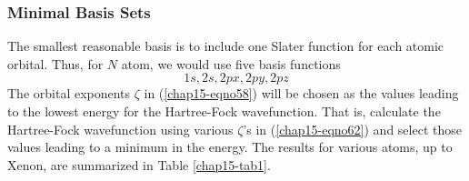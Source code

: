 \subsubsection{Minimal Basis Sets}

The smallest reasonable basis is to include one Slater function for each
atomic orbital. Thus, for $N$ atom, we would use five basis functions
\begin{equation}
1s,2s,2px,2py,2pz 
\label{chap15-eqno62}
\end{equation}
The orbital exponents $\zeta$ in (\ref{chap15-eqno58}) will be chosen
as the values leading to the lowest energy for the Hartree-Fock
wavefunction. That is, calculate the Hartree-Fock wavefunction using
various $\zeta$'s in (\ref{chap15-eqno62}) and select those values
leading to a minimum in the energy. The results for various atoms, up
to Xenon, are summarized in Table
\ref{chap15-tab1}.

